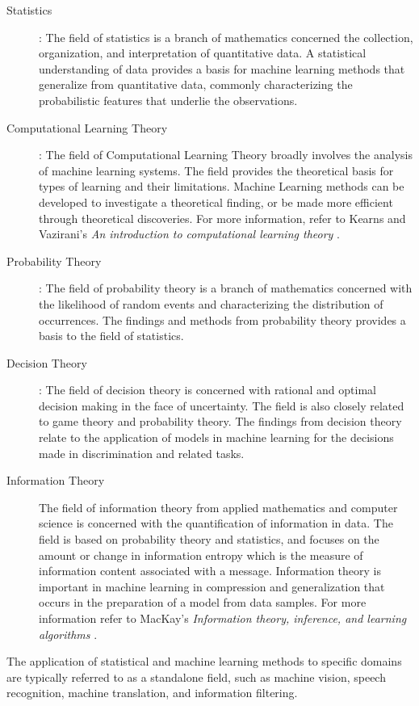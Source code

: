 \documentclass[a4paper, 11pt]{article}
\begin{document}
\begin{description}
	\item[Statistics]: The field of statistics is a branch of mathematics concerned the collection, organization, and interpretation of quantitative data. A statistical understanding of data provides a basis for machine learning methods that generalize from quantitative data, commonly characterizing the probabilistic features that underlie the observations.
	\item[Computational Learning Theory]: The field of Computational Learning Theory broadly involves the analysis of machine learning systems. The field provides the theoretical basis for types of learning and their limitations. Machine Learning methods can be developed to investigate a theoretical finding, or be made more efficient through theoretical discoveries. For more information, refer to Kearns and Vazirani's \emph{An introduction to computational learning theory} \cite{Kearns1994}.
	\item[Probability Theory]: The field of probability theory is a branch of mathematics concerned with the likelihood of random events and characterizing the distribution of occurrences. The findings and methods from probability theory provides a basis to the field of statistics. 
	\item[Decision Theory]: The field of decision theory is concerned with rational and optimal decision making in the face of uncertainty. The field is also closely related to game theory and probability theory. The findings from decision theory relate to the application of models in machine learning for the decisions made in discrimination and related tasks.
	\item[Information Theory]	The field of information theory from applied mathematics and computer science is concerned with the quantification of information in data. The field is based on probability theory and statistics, and focuses on the amount or change in information entropy which is the measure of information content associated with a message. Information theory is important in machine learning in compression and generalization that occurs in the preparation of a model from data samples. For more information refer to MacKay's \emph{Information theory, inference, and learning algorithms} \cite{MacKay2003}.
\end{description}

The application of statistical and machine learning methods to specific domains are typically referred to as a standalone field, such as machine vision, speech recognition, machine translation, and information filtering.
\end{document}
